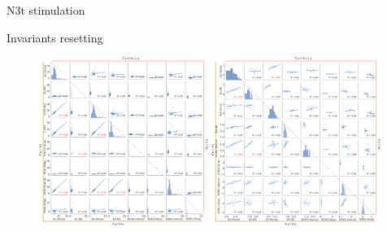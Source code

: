 \documentclass[aspectratio=43]{beamer}
\begin{document}
\begin{frame}{N3t stimulation}
\begin{figure}[hbt!]
\begin{minipage}[b]{0.44\textwidth}
\begin{minipage}[b]{\textwidth}
			\end{minipage}
		\end{minipage}
	\end{figure}
	
\end{frame}

\begin{frame}{Invariants resetting}
	
	\begin{figure}[htbp]
		\centering
		\includegraphics[width=0.49\textwidth]{./invariants/data/SUSSEX/prep2/images/2phases/output_pairplot_reset_triangle.png}
		\includegraphics[width=0.49\textwidth]{./invariants/data/SUSSEX/SO_driven/images/output_pairplot_reset_triangle.png}
	\end{figure}
\end{frame}
\end{document}
